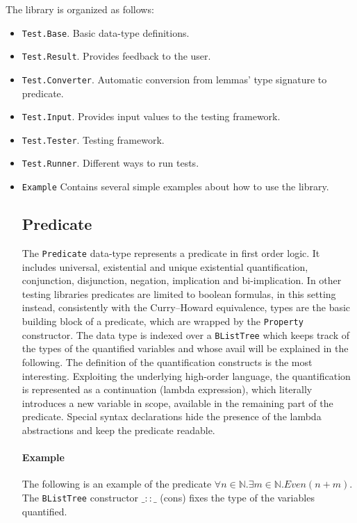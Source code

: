\documentclass[10pt,a4paper]{article}
\begin{document}
The library is organized as follows:
\begin{itemize}
	\item \texttt{Test.Base}. Basic data-type definitions.
	\item \texttt{Test.Result}. Provides feedback to the user.
	\item \texttt{Test.Converter}. Automatic conversion from lemmas' type signature to predicate.
	\item \texttt{Test.Input}. Provides input values to the testing framework.
	\item \texttt{Test.Tester}. Testing framework.
	\item \texttt{Test.Runner}. Different ways to run tests.
	\item \texttt{Example} Contains several simple examples about how to use the library.
	
\subsection{Predicate}
The \texttt{Predicate} data-type represents a predicate in first order logic.
It includes universal, existential and unique existential quantification, conjunction, disjunction, negation, implication and bi-implication.
In other testing libraries predicates are limited to boolean formulas, in this setting instead, consistently with the Curry–Howard equivalence, types are the basic building block of a predicate, which are wrapped by the \texttt{Property} constructor.
The data type is indexed over a \texttt{BListTree} which keeps track of the types of the quantified variables and whose avail will be explained in the following.
The definition of the quantification constructs is the most interesting.
Exploiting the underlying high-order language, the quantification is represented as a continuation (lambda expression), which literally introduces a new variable in scope, available in the remaining part of the predicate.
Special syntax declarations hide the presence of the lambda abstractions and keep the predicate readable.

\paragraph{Example}
The following is an example of the predicate $\forall n \in \mathbb{N} . \exists m \in \mathbb{N} . Even (n + m)$. The \texttt{BListTree} constructor $\_::\_$ (cons) fixes the type of the variables quantified.  


\end{itemize}
\end{document}

